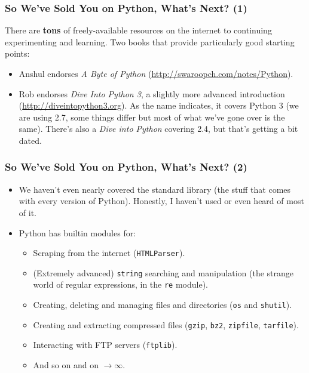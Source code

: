 \documentclass[10pt]{beamer}
\begin{document}
\begin{frame}
  \frametitle{So We've Sold You on Python, What's Next? (1)}
    There are \textbf{tons} of freely-available resources on the internet to continuing experimenting and learning. 
      Two books that provide particularly good starting points:
  \begin{itemize}
    \item Anshul endorses \emph{A Byte of Python} (\href{http://swaroopch.com/notes/Python}{http://swaroopch.com/notes/Python}).
    \item Rob endorses \emph{Dive Into Python 3}, a slightly more advanced introduction (\href{http://diveintopython3.org}{http://diveintopython3.org}).  As the name indicates, it covers Python 3 (we are using 2.7, some things differ but most of what we've gone over is the same).
    There's also a \emph{Dive into Python}   covering 2.4, but that's getting a bit dated.
  \end{itemize}
\end{frame}

\begin{frame}
  \frametitle{So We've Sold You on Python, What's Next? (2)}
  \begin{itemize}
    \item We haven't even nearly covered the standard library (the stuff that comes with every version of Python). 
      Honestly, I haven't used or even heard of most of it.
    \item Python has builtin modules for:
    \begin{itemize} 
      \item Scraping from the internet (\texttt{HTMLParser}).
      \item (Extremely advanced) \texttt{string} searching and manipulation (the strange world of regular expressions, in the \texttt{re} module).
      \item Creating, deleting and managing files and directories (\texttt{os} and \texttt{shutil}).
      \item Creating and extracting compressed files (\texttt{gzip}, \texttt{bz2}, \texttt{zipfile}, \texttt{tarfile}).
      \item Interacting with FTP servers (\texttt{ftplib}).
      \item And so on and on $\rightarrow \infty$.
    \end{itemize}
  \end{itemize}
\end{frame}
\end{document}
